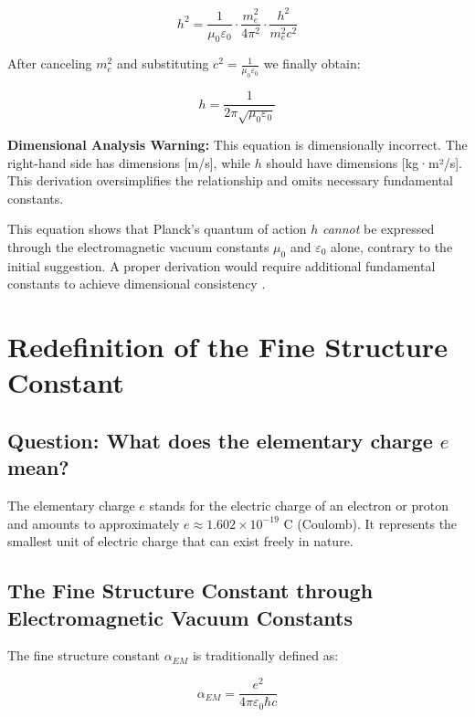 \documentclass[12pt,a4paper]{article}
\begin{document}
	\begin{equation}
		h^2 = \frac{1}{\mu_0\varepsilon_0} \cdot \frac{m_e^2}{4\pi^2} \cdot \frac{h^2}{m_e^2c^2}
	\end{equation}
	
	After canceling $m_e^2$ and substituting $c^2 = \frac{1}{\mu_0\varepsilon_0}$ we finally obtain:
	
	\begin{equation}
		h = \frac{1}{2\pi\sqrt{\mu_0\varepsilon_0}}
	\end{equation}
	
	\textbf{Dimensional Analysis Warning:} This equation is dimensionally incorrect. The right-hand side has dimensions [m/s], while $h$ should have dimensions [kg·m²/s]. This derivation oversimplifies the relationship and omits necessary fundamental constants.
	
	This equation shows that Planck's quantum of action $h$ \textit{cannot} be expressed through the electromagnetic vacuum constants $\mu_0$ and $\varepsilon_0$ alone, contrary to the initial suggestion. A proper derivation would require additional fundamental constants to achieve dimensional consistency \cite{Planck1900}.
	
	\section{Redefinition of the Fine Structure Constant}
	
	\subsection{Question: What does the elementary charge $e$ mean?}
	
	The elementary charge $e$ stands for the electric charge of an electron or proton and amounts to approximately $e \approx 1.602 \times 10^{-19}$ C (Coulomb). It represents the smallest unit of electric charge that can exist freely in nature.
	
	\subsection{The Fine Structure Constant through Electromagnetic Vacuum Constants}
	
	The fine structure constant $\alpha_{EM}$ is traditionally defined as:
	
	\begin{equation}
		\alpha_{EM} = \frac{e^2}{4\pi\varepsilon_0\hbar c}
	\end{equation}
	
\end{document}
